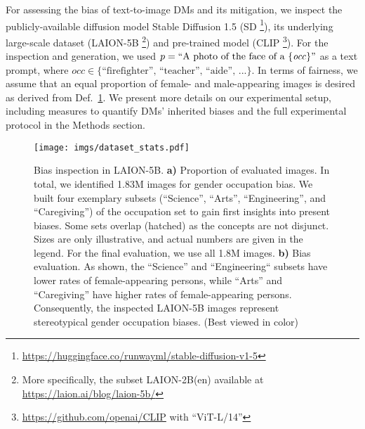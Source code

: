 \documentclass{article}%
\begin{document}
For assessing the bias of text-to-image DMs and its mitigation, we inspect the publicly-available diffusion model Stable Diffusion 1.5 (SD \cite{Rombach_2022_CVPR}\footnote{\url{https://huggingface.co/runwayml/stable-diffusion-v1-5}}), its underlying large-scale dataset (LAION-5B \cite{schuhmann2022laion}\footnote{More specifically, the subset LAION-2B(en) 
available at \url{https://laion.ai/blog/laion-5b/}}) and pre-trained model (CLIP \cite{radford2021learning}\footnote{\url{https://github.com/openai/CLIP} with ``ViT-L/14''}). 
For the inspection and generation, we used $p=\text{``A photo of the face of a \{\textit{occ}\}''}$ as a text prompt, where \mbox{$\textit{occ}\in \{\text{``firefighter'', ``teacher'', ``aide'', ...}\}$}.
In terms of fairness, we assume that an equal proportion of female- and male-appearing images is desired as derived from Def.~\hyperref[def:fair1]{1}. 
We present more details on our experimental setup, including measures to quantify DMs' inherited biases and the full experimental protocol in the Methods section.
\begin{figure}[t]
        \centering
        \texttt{[image: imgs/dataset\_stats.pdf]}
   \caption{Bias inspection in LAION-5B. \textbf{a)} Proportion of evaluated images. In total, we identified 1.83M images for gender occupation bias. We built four exemplary subsets (``Science'', ``Arts'', ``Engineering'', and ``Caregiving'') of the occupation set to gain first insights into present biases. Some sets overlap (hatched) as the concepts are not disjunct.
   Sizes are only illustrative, and actual numbers are given in the legend. For the final evaluation, we use all 1.8M images. \textbf{b)} Bias evaluation. As shown, the ``Science'' and ``Engineering`` subsets have lower rates of female-appearing persons, while ``Arts'' and ``Caregiving'' have higher rates of female-appearing persons. Consequently, the inspected LAION-5B images represent stereotypical gender occupation biases. (Best viewed in color)}
   \label{fig:dataset-stats}
\end{figure}
\end{document}
